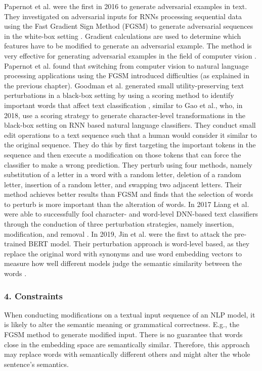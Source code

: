     Papernot et al. were the first in 2016 to generate adversarial examples in text. They investigated on adversarial inputs for RNNs processing sequential data using the Fast Gradient Sign Method (FGSM) to generate adversarial sequences in the white-box setting \cite{papernot2016crafting}. 
    Gradient calculations are used to determine which features have to be modified to generate an adversarial example. The method is very effective for generating adversarial examples in the field of computer vision \cite{goodfellow2014explaining}.
    Papernot et al. found that switching from computer vision to natural language processing applications using the FGSM introduced difficulties (as explained in the previous chapter). 
    Goodman et al. generated small utility-preserving text perturbations in a black-box setting by using a scoring method to identify important words that affect text classification \cite{goodman2020fastwordbug}, similar to Gao et al., who, in 2018, use a scoring strategy to generate character-level transformations in the black-box setting on RNN based natural language classifiers. They conduct small edit operations to a text sequence such that a human would consider it similar to the original sequence. They do this by first targeting the important tokens in the sequence and then execute a modification on those tokens that can force the classifier to make a wrong prediction. They perturb using four methods, namely substitution of a letter in a word with a random letter, deletion of a random letter, insertion of a random letter, and swapping two adjacent letters. Their method achieves better results than FGSM  and finds that the selection of words to perturb is more important than the alteration of words\cite{gao2018black}.  In 2017 Liang et al. were able to successfully fool character- and word-level DNN-based text classifiers through the conduction of three perturbation strategies, namely insertion, modification, and removal \cite{liang2017deep}. In 2019, Jin et al. were the first to attack the pre-trained BERT model. Their perturbation approach is word-level based, as they replace the original word with synonyms and use word embedding vectors to measure how well different models judge the semantic similarity between the words \cite{jin2019bert}.
    
    
\subsubsection{4. Constraints}
    When conducting modifications on a textual input sequence of an NLP model, it is likely to alter the semantic meaning or grammatical correctness. E.g.,  the FGSM method to generate modified input. There is no guarantee that words close in the embedding space are semantically similar. Therefore, this approach may replace words with semantically different others and might alter the whole sentence's semantics.
    
